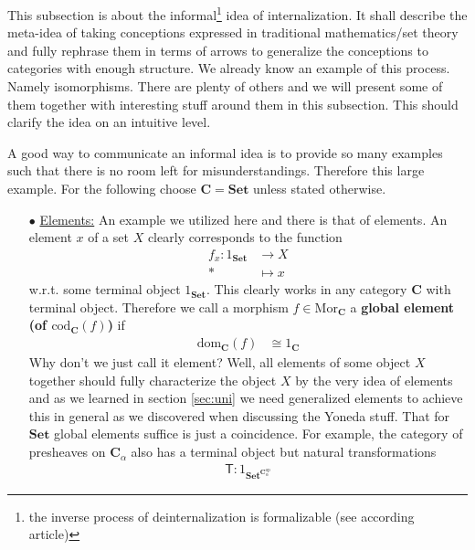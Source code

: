 \nocite{eec64bc7}
This subsection is about the informal\footnote{the inverse process of deinternalization is formalizable (see according \cite{wiki-nlab0000} article)} idea of internalization. It shall describe the meta-idea of taking conceptions expressed in traditional mathematics/set theory and fully rephrase them in terms of arrows to generalize the conceptions to categories with enough structure. We already know an example of this process. Namely isomorphisms. There are plenty of others and we will present some of them together with interesting stuff around them in this subsection. This should clarify the idea on an intuitive level.
\\
\begin{exa}
\label{exa:ofinternaliz}
A good way to communicate an informal idea is to provide so many examples such that there is no room left for misunderstandings. Therefore this large example. For the following choose $\mathbf{C} = \mathbf{Set}$ unless stated otherwise.
\begin{enumerate}
\item[$\bullet$]
\underline{Elements:}
An example we utilized here and there is that of elements. An element $x$ of a set $X$ clearly corresponds to the function
\begin{align*}
  f_{x}
  \colon
  1_{\mathbf{Set}}
  &\rightarrow
  X
  \\
  \ast
  &\mapsto
  x
\end{align*}
w.r.t. some terminal object $1_{\mathbf{Set}}$. This clearly works in any category $\mathbf{C}$ with terminal object. Therefore we call a morphism $f \in \mathrm{Mor}_{\mathbf{C}}$ a \textbf{global element (of $\mathrm{cod}_{\mathbf{C}}(f)$)} if
\begin{align*}
  \mathrm{dom}_{\mathbf{C}}(f)
  &\cong
  1_{\mathbf{C}}
\end{align*}
Why don't we just call it {\glqq}element{\grqq}? Well, all elements of some object $X$ together should fully characterize the object $X$ by the very idea of elements and as we learned in section \ref{sec:uni} we need generalized elements to achieve this in general as we discovered when discussing the Yoneda stuff. That for $\mathbf{Set}$ global elements suffice is just a coincidence. For example, the category of presheaves on $\mathbf{C}_{\alpha}$ also has a terminal object but natural transformations
\begin{align*}
  \mathsf{T}
  \colon
  1_{\mathbf{Set}^{\mathbf{C}_{\alpha}^{\mathrm{op}}}}

\end{align*}
\end{enumerate}
\end{exa}
